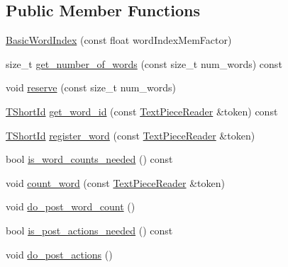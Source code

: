 \subsection*{Public Member Functions}
\begin{DoxyCompactItemize}
\item 
\hyperlink{classuva_1_1smt_1_1tries_1_1dictionary_1_1_basic_word_index_a86bfea6c929c9886d2ab4d96bd50beef}{Basic\+Word\+Index} (const float word\+Index\+Mem\+Factor)
\item 
size\+\_\+t \hyperlink{classuva_1_1smt_1_1tries_1_1dictionary_1_1_basic_word_index_af26b670cce631e7a8df05bd47ebcafb8}{get\+\_\+number\+\_\+of\+\_\+words} (const size\+\_\+t num\+\_\+words) const 
\item 
void \hyperlink{classuva_1_1smt_1_1tries_1_1dictionary_1_1_basic_word_index_a89fdce44475397fe529db8424d4300ad}{reserve} (const size\+\_\+t num\+\_\+words)
\item 
\hyperlink{namespaceuva_1_1smt_1_1hashing_adcf22e1982ad09d3a63494c006267469}{T\+Short\+Id} \hyperlink{classuva_1_1smt_1_1tries_1_1dictionary_1_1_basic_word_index_ae0c3dad47f5c8e474d9c9e6bb2de6a78}{get\+\_\+word\+\_\+id} (const \hyperlink{classuva_1_1smt_1_1file_1_1_text_piece_reader}{Text\+Piece\+Reader} \&token) const 
\item 
\hyperlink{namespaceuva_1_1smt_1_1hashing_adcf22e1982ad09d3a63494c006267469}{T\+Short\+Id} \hyperlink{classuva_1_1smt_1_1tries_1_1dictionary_1_1_basic_word_index_a2cc974fa7403a0d9593cfdea8123da91}{register\+\_\+word} (const \hyperlink{classuva_1_1smt_1_1file_1_1_text_piece_reader}{Text\+Piece\+Reader} \&token)
\item 
bool \hyperlink{classuva_1_1smt_1_1tries_1_1dictionary_1_1_basic_word_index_a185eea70c76475b1e115234918ef69eb}{is\+\_\+word\+\_\+counts\+\_\+needed} () const 
\item 
void \hyperlink{classuva_1_1smt_1_1tries_1_1dictionary_1_1_basic_word_index_a9029cd23e742f68083941deb1f814fca}{count\+\_\+word} (const \hyperlink{classuva_1_1smt_1_1file_1_1_text_piece_reader}{Text\+Piece\+Reader} \&token)
\item 
void \hyperlink{classuva_1_1smt_1_1tries_1_1dictionary_1_1_basic_word_index_a6250189f2ca95835b2566e80fa1041d4}{do\+\_\+post\+\_\+word\+\_\+count} ()
\item 
bool \hyperlink{classuva_1_1smt_1_1tries_1_1dictionary_1_1_basic_word_index_a457c13d8a2274f4aad92cd0fb9e96771}{is\+\_\+post\+\_\+actions\+\_\+needed} () const 
\item 
void \hyperlink{classuva_1_1smt_1_1tries_1_1dictionary_1_1_basic_word_index_aab36571ea0e94d02138680609cdbecb0}{do\+\_\+post\+\_\+actions} ()

\end{DoxyCompactItemize}
